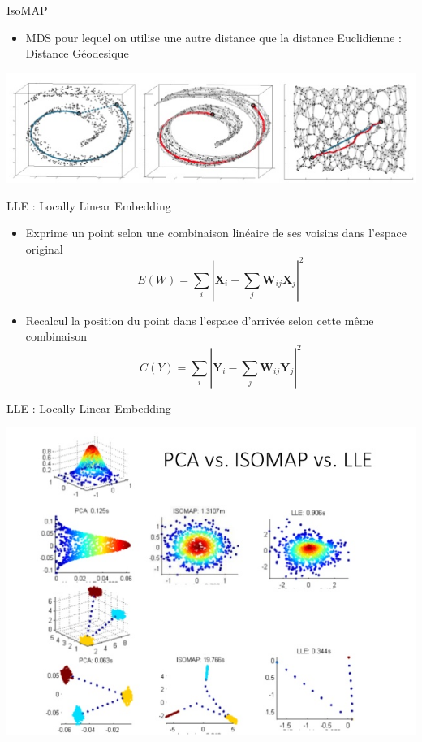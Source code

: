 \documentclass[french]{beamer}
\begin{document}
\begin{frame}{IsoMAP}
\begin{itemize}
	\item MDS pour lequel on utilise une autre distance que la distance Euclidienne : Distance Géodesique
\end{itemize}
\begin{center}
	\includegraphics[width=\textwidth]{isomap}
\end{center}
\end{frame}

\begin{frame}{LLE : Locally Linear Embedding}
\begin{itemize}
	\item Exprime un point selon une combinaison linéaire de ses voisins dans l'espace original
	$${E}(W) = \sum_i |\mathbf{X}_i - \sum_j \mathbf{W}_{ij}\mathbf{X}_j|^2$$
	\item Recalcul la position du point dans l'espace d'arrivée selon cette même combinaison 	
	$${C}(Y) = \sum_i |\mathbf{Y}_i - \sum_j \mathbf{W}_{ij}\mathbf{Y}_j|^2$$
\end{itemize}
\end{frame}

\begin{frame}{LLE : Locally Linear Embedding}
\begin{center}
	\includegraphics[width=.95\textwidth]{lle}
\end{center}
\end{frame}
\end{document}
